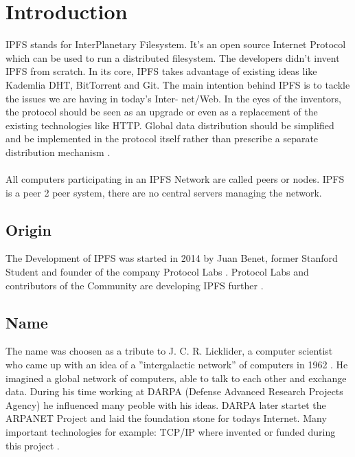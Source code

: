 \documentclass[a4paper,11pt, oneside]{report}
\theoremstyle{definition}
\begin{document}
\chapter{Introduction}
IPFS stands for InterPlanetary Filesystem. It’s an open source Internet Protocol which can be used to run a distributed filesystem. The developers didn’t invent IPFS from scratch. In its core, IPFS takes advantage of existing ideas like Kademlia DHT, BitTorrent and Git. The main intention behind IPFS is to tackle the issues we are having in today's Inter- net/Web. In the eyes of the inventors, the protocol should be seen as an upgrade or even as a replacement of the existing technologies like HTTP. Global data distribution should be simplified and be implemented in the protocol itself rather than prescribe a separate distribution mechanism \cite{IPFSBasics}.\\ \\
All computers participating in an IPFS Network are called peers or nodes. IPFS is a peer 2 peer system, there are no central servers managing the network.

\section{Origin}
The Development of IPFS was started in 2014 by Juan Benet, former Stanford Student and founder of the company Protocol Labs . Protocol Labs and contributors of the Community are developing IPFS further \cite{LinkedIn}.

\section{Name}
The name was choosen as a tribute to J. C. R. Licklider, a computer scientist who came up with an idea of a ''intergalactic network'' of computers in 1962 \cite{Tribute}. He imagined a global network of computers, able to talk to each other and exchange data. During his time working at DARPA (Defense Advanced Research Projects Agency) he influenced many peoble with his ideas. DARPA later startet the ARPANET Project and laid the foundation stone for todays Internet. Many important technologies for example: TCP/IP where invented or funded during this project \cite{JCR}. 

\newpage
\end{document}
